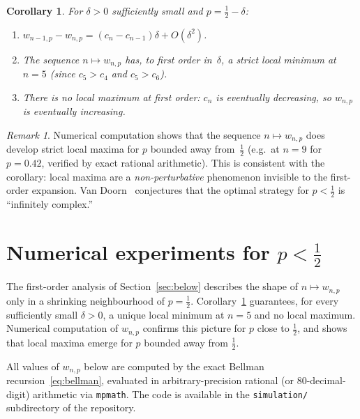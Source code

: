 \documentclass[reqno,final,11pt]{amsart}
\theoremstyle{plain}
\newtheorem{corollary}[theorem]{Corollary}
\theoremstyle{definition}
\theoremstyle{remark}
\newtheorem{remark}[theorem]{Remark}
\begin{document}
\begin{corollary}\label{cor:shape}
  For $\delta>0$ sufficiently small and $p=\tfrac12-\delta$:
  \begin{enumerate}[\rm(i)]
  \item $w_{n-1,p}-w_{n,p}=(c_n-c_{n-1})\delta+O(\delta^2)$.
  \item The sequence $n\mapsto w_{n,p}$ has, to first order
    in~$\delta$, a strict local minimum at $n=5$ (since $c_5>c_4$
    and $c_5>c_6$).
  \item There is no local maximum at first order: $c_n$ is eventually
    decreasing, so $w_{n,p}$ is eventually increasing.
  \end{enumerate}
\end{corollary}

\begin{remark}
  Numerical computation shows that the sequence $n\mapsto w_{n,p}$
  does develop strict local maxima for $p$ bounded away
  from~$\tfrac12$ (e.g.\ at $n=9$ for $p=0.42$, verified by exact
  rational arithmetic).  This is consistent with the corollary: local
  maxima are a \emph{non-perturbative} phenomenon invisible to the
  first-order expansion.  Van Doorn~\citeyearpar[Section~10]{vanDoorn2024}
  conjectures that the optimal strategy for $p<\tfrac12$ is
  ``infinitely complex.''
\end{remark}

\section{Numerical experiments for \texorpdfstring{$p<\tfrac12$}{p<1/2}}\label{sec:numerics}

The first-order analysis of Section~\ref{sec:below} describes
the shape of $n\mapsto w_{n,p}$ only in a shrinking neighbourhood
of $p=\tfrac12$.  Corollary~\ref{cor:shape} guarantees, for every
sufficiently small $\delta>0$, a unique local minimum at $n=5$ and
no local maximum.  Numerical computation of $w_{n,p}$ confirms
this picture for $p$ close to $\tfrac12$, and shows that local
maxima emerge for $p$ bounded away from $\tfrac12$.

All values of $w_{n,p}$ below are computed by the exact Bellman
recursion~\eqref{eq:bellman}, evaluated in arbitrary-precision
rational (or $80$-decimal-digit) arithmetic via
\texttt{mpmath}.  The code is available in the \texttt{simulation/}
subdirectory of the repository.
\end{document}
